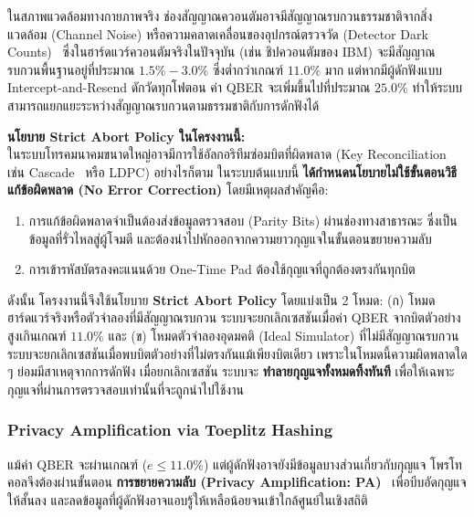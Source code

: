 ในสภาพแวดล้อมทางกายภาพจริง ช่องสัญญาณควอนตัมอาจมีสัญญาณรบกวนธรรมชาติจากสิ่งแวดล้อม (Channel Noise) หรือความคลาดเคลื่อนของอุปกรณ์ตรวจวัด (Detector Dark Counts)~\cite{scarani_qkd_practical} ซึ่งในฮาร์ดแวร์ควอนตัมจริงในปัจจุบัน (เช่น ชิปควอนตัมของ IBM) จะมีสัญญาณรบกวนพื้นฐานอยู่ที่ประมาณ $1.5\% - 3.0\%$ ซึ่งต่ำกว่าเกณฑ์ $11.0\%$ มาก แต่หากมีผู้ดักฟังแบบ Intercept-and-Resend ดักวัดทุกโฟตอน ค่า QBER จะเพิ่มขึ้นไปที่ประมาณ $25.0\%$ ทำให้ระบบสามารถแยกแยะระหว่างสัญญาณรบกวนตามธรรมชาติกับการดักฟังได้

\noindent \textbf{นโยบาย Strict Abort Policy ในโครงงานนี้:}\\
ในระบบโทรคมนาคมขนาดใหญ่อาจมีการใช้อัลกอริทึมซ่อมบิตที่ผิดพลาด (Key Reconciliation เช่น Cascade~\cite{brassard_salvail_cascade} หรือ LDPC) อย่างไรก็ตาม ในระบบต้นแบบนี้ \textbf{ได้กำหนดนโยบายไม่ใช้ขั้นตอนวิธีแก้ข้อผิดพลาด (No Error Correction)} โดยมีเหตุผลสำคัญคือ:
\begin{enumerate}
    \item การแก้ข้อผิดพลาดจำเป็นต้องส่งข้อมูลตรวจสอบ (Parity Bits) ผ่านช่องทางสาธารณะ ซึ่งเป็นข้อมูลที่รั่วไหลสู่ผู้โจมตี และต้องนำไปหักออกจากความยาวกุญแจในขั้นตอนขยายความลับ
    \item การเข้ารหัสบัตรลงคะแนนด้วย One-Time Pad ต้องใช้กุญแจที่ถูกต้องตรงกันทุกบิต
\end{enumerate}
ดังนั้น โครงงานนี้จึงใช้นโยบาย \textbf{Strict Abort Policy} โดยแบ่งเป็น 2 โหมด: (ก) โหมดฮาร์ดแวร์จริงหรือตัวจำลองที่มีสัญญาณรบกวน ระบบจะยกเลิกเซสชันเมื่อค่า QBER จากบิตตัวอย่างสูงเกินเกณฑ์ $11.0\%$ และ (ข) โหมดตัวจำลองอุดมคติ (Ideal Simulator) ที่ไม่มีสัญญาณรบกวน ระบบจะยกเลิกเซสชันเมื่อพบบิตตัวอย่างที่ไม่ตรงกันแม้เพียงบิตเดียว เพราะในโหมดนี้ความผิดพลาดใด ๆ ย่อมมีสาเหตุจากการดักฟัง เมื่อยกเลิกเซสชัน ระบบจะ \textbf{ทำลายกุญแจทั้งหมดทิ้งทันที} เพื่อให้เฉพาะกุญแจที่ผ่านการตรวจสอบเท่านั้นที่จะถูกนำไปใช้งาน

\subsubsection{Privacy Amplification via Toeplitz Hashing}
แม้ค่า QBER จะผ่านเกณฑ์ ($e \le 11.0\%$) แต่ผู้ดักฟังอาจยังมีข้อมูลบางส่วนเกี่ยวกับกุญแจ โพรโทคอลจึงต้องผ่านขั้นตอน \textbf{การขยายความลับ (Privacy Amplification: PA)}~\cite{bennett_privacy_amp_1995} เพื่อบีบอัดกุญแจให้สั้นลง และลดข้อมูลที่ผู้ดักฟังอาจแอบรู้ให้เหลือน้อยจนเข้าใกล้ศูนย์ในเชิงสถิติ

